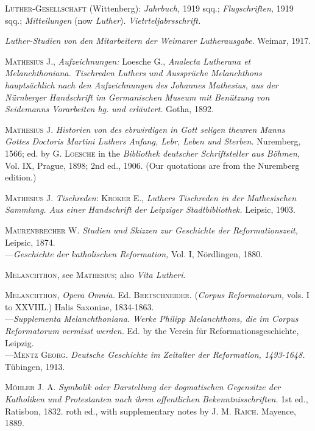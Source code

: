 \textsc{Luther-Gesellschaft} (Wittenberg): \textit{Jahrbuch,} 1919 sqq.; \textit{Flugschriften,}
1919 sqq.; \textit{Mitteilungen} (now \textit{Luther}). \textit{Vietrteljabrsschrift.}

\textit{Luther-Studien von den Mitarbeitern der Weimarer Lutherausgabe.} Weimar,
1917.

\textsc{Mathesius J.}, \textit{Aufzeichnungen:} Loesche G., \textit{Analecta Lutherana et Melanchthoniana.
Tischreden Luthers und Aussprüche Melanchthons hauptsächlich
nach den Aufzeichnungen des Johannes Mathesius, aus der Nürnberger
Handschrift im Germanischen Museum mit Benützung von Seidemanns
Vorarbeiten hg. und erläutert.} Gotha, 1892.

\textsc{Mathesius J.} \textit{Historien von des ebrwirdigen in Gott seligen thewren Manns
Gottes Doctoris Martini Luthers Anfang, Lebr, Leben und Sterben.}
Nuremberg, 1566; ed. by \textsc{G. Loesche} in the \textit{Bibliothek deutscher Schriftsteller
aus Böhmen}, Vol. IX, Prague, 1898; 2nd ed., 1906. (Our quotations
are from the Nuremberg edition.)

\textsc{Mathesius J.} \textit{Tischreden}: \textsc{Kroker E.}, \textit{Luthers Tischreden in der Mathesischen
Sammlung. Aus einer Handschrift der Leipziger Stadtbibliothek.} Leipsic,
1903.

\textsc{Maurenbrecher W.} \textit{Studien und Skizzen zur Geschichte der Reformationszeit,}
Leipsic, 1874. \\
---\textit{Geschichte der katholischen Reformation,} Vol. I, Nördlingen, 1880.

\textsc{Melanchthon}, see \textsc{Mathesius}; also \textit{Vita Lutheri}.

\textsc{Melanchthon}, \textit{Opera Omnia.} Ed. \textsc{Bretschneider.} (\textit{Corpus Reformatorum,}
vols. I to XXVIIL.) Halis Saxoniae, 1834-1863. \\
---\textit{Supplementa Melanchthoniana. Werke Philipp Melanchthons, die im
Corpus Reformatorum vermisst werden.} Ed. by the Verein für Reformationsgeschichte, Leipzig. \\
---\textsc{Mentz Georg.} \textit{Deutsche Geschichte im Zeitalter der Reformation, 1493-1648.}
Tübingen, 1913.

\textsc{Möhler J. A.} \textit{Symbolik oder Darstellung der dogmatischen Gegensitze der
Katholiken und Protestanten nach ibren offentlichen Bekenntnisschriften.}
1st ed., Ratisbon, 1832. roth ed., with supplementary notes by \textsc{J. M.
Raich.} Mayence, 1889.


